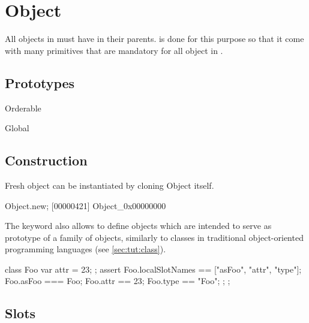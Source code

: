 
\section{Object}

All objects in \us must have  in their
parents.  is done for this purpose so that it come
with many primitives that are mandatory for all object in \us.

\subsection{Prototypes}

\begin{refObjects}
\item[Orderable]
\item[Global]
\end{refObjects}

\subsection{Construction}

Fresh object can be instantiated by cloning Object itself.

\begin{urbiscript}[firstnumber=1]
Object.new;
[00000421] Object_0x00000000
\end{urbiscript}

The keyword  also allows to define objects which are
intended to serve as prototype of a family of objects, similarly to
classes in traditional object-oriented programming languages (see
\autoref{sec:tut:class}).

\begin{urbiscript}
{
  class Foo
  {
    var attr = 23;
  };
  assert
  {
    Foo.localSlotNames == ["asFoo", "attr", "type"];
    Foo.asFoo === Foo;
    Foo.attr == 23;
    Foo.type == "Foo";
  };
};
\end{urbiscript}


\subsection{Slots}

